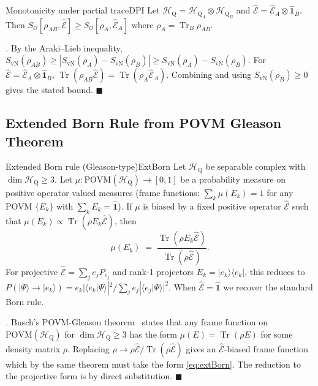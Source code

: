 \documentclass[11pt,a4paper]{article}
\theoremstyle{myrmk}
\renewenvironment{proof}[1][\proofname]{%
  \par\noindent\textit{#1.}\enspace\ignorespaces}{\hfill$\blacksquare$\par\medskip}
\newcommand{\HH}{\mathcal{H}_{\mathrm{Q}}}
\newcommand{\Tr}{\operatorname{Tr}}
\newcommand{\Ehat}{\hat{\mathcal{E}}}
\newcommand{\Identity}{\hat{\mathbf{1}}}
\newcommand{\ket}[1]{|#1\rangle}
\newcommand{\bra}[1]{\langle#1|}
\newcommand{\braket}[2]{\langle#1|#2\rangle}
\begin{document}
\begin{theorem}{Monotonicity under partial trace}{DPI}
Let $\HH=\HH_A\otimes\HH_B$ and $\Ehat=\Ehat_A\otimes\Identity_B$. Then
$S_{\mathcal{O}}[\rho_{AB},\Ehat]\geq S_{\mathcal{O}}[\rho_A,\Ehat_A]$
where $\rho_A=\Tr_B\rho_{AB}$.
\end{theorem}

\begin{proof}
By the Araki--Lieb inequality, $S_{\mathrm{vN}}(\rho_{AB})\geq |S_{\mathrm{vN}}(\rho_A)-S_{\mathrm{vN}}(\rho_B)|
\geq S_{\mathrm{vN}}(\rho_A)-S_{\mathrm{vN}}(\rho_B)$. For $\Ehat=\Ehat_A\otimes\Identity_B$,
$\Tr(\rho_{AB}\Ehat)=\Tr(\rho_A\Ehat_A)$. Combining and using $S_{\mathrm{vN}}(\rho_B)\geq 0$
gives the stated bound.
\end{proof}

\subsection{Extended Born Rule from POVM Gleason Theorem}

\begin{theorem}{Extended Born rule (Gleason-type)}{ExtBorn}
Let $\HH$ be separable complex with $\dim\HH\geq 3$. Let
$\mu:\mathrm{POVM}(\HH)\to[0,1]$ be a probability measure on positive operator valued
measures (frame functions: $\sum_k\mu(E_k)=1$ for any POVM $\{E_k\}$ with
$\sum_k E_k=\Identity$). If $\mu$ is biased by a fixed positive operator $\Ehat$ such
that $\mu(E_k)\propto\Tr(\rho E_k\Ehat)$, then
\begin{equation}
  \mu(E_k)\;=\;\frac{\Tr(\rho E_k\Ehat)}{\Tr(\rho\Ehat)}.
  \label{eq:extBorn}
\end{equation}
For projective $\Ehat=\sum_j e_j P_{e_j}$ and rank-1 projectors $E_k=\ket{e_k}\bra{e_k}$,
this reduces to
$P(\ket\Psi\!\to\!\ket{e_k})=e_k|\braket{e_k}{\Psi}|^2/\sum_j e_j|\braket{e_j}{\Psi}|^2$.
When $\Ehat=\Identity$ we recover the standard Born rule.
\end{theorem}

\begin{proof}
Busch's POVM-Gleason theorem~\cite{Busch2003} states that any frame function on
$\mathrm{POVM}(\HH)$ for $\dim\HH\geq 3$ has the form $\mu(E)=\Tr(\rho E)$ for some
density matrix $\rho$. Replacing $\rho\to\rho\Ehat/\Tr(\rho\Ehat)$ gives an
$\Ehat$-biased frame function which by the same theorem must take the form
\eqref{eq:extBorn}. The reduction to the projective form is by direct substitution.
\end{proof}
\end{document}
